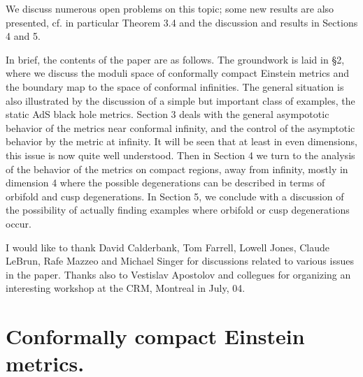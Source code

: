 \documentclass[11pt,amsfonts]{amsart}
\begin{document}
  We discuss numerous open problems on this topic; some new results are also 
presented, cf. in particular Theorem 3.4 and the discussion and results in 
Sections 4 and 5. 

\medskip

 In brief, the contents of the paper are as follows. The groundwork is laid 
in \S 2, where we discuss the moduli space of conformally compact Einstein metrics 
and the boundary map to the space of conformal infinities. The general situation 
is also illustrated by the discussion of a simple but important class of examples, 
the static AdS black hole metrics. Section 3 deals with the general asympototic 
behavior of the metrics near conformal infinity, and the control of the asymptotic 
behavior by the metric at infinity. It will be seen that at least in even 
dimensions, this issue is now quite well understood. Then in Section 4 we turn 
to the analysis of the behavior of the metrics on compact regions, away from 
infinity, mostly in dimension 4 where the possible degenerations can be described 
in terms of orbifold and cusp degenerations. In Section 5, we conclude with a 
discussion of the possibility of actually finding examples where orbifold or 
cusp degenerations occur. 

\medskip


  I would like to thank David Calderbank, Tom Farrell, Lowell Jones, 
Claude LeBrun, Rafe Mazzeo and Michael Singer for discussions related 
to various issues in the paper. Thanks also to Vestislav Apostolov and 
collegues for organizing an interesting workshop at the CRM, Montreal 
in July, 04. 


\section{Conformally compact Einstein metrics.}
\setcounter{equation}{0}
\end{document}
